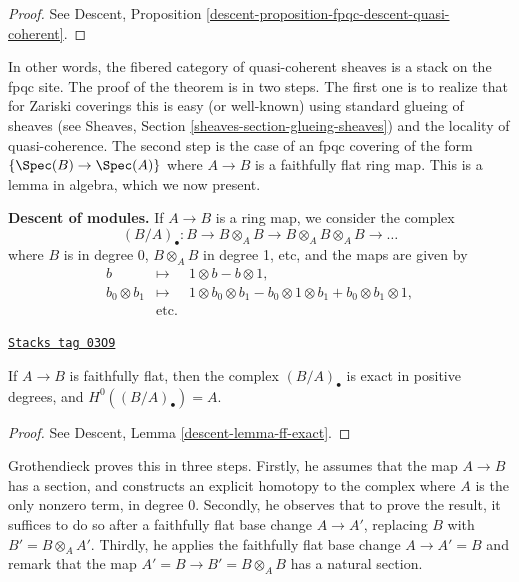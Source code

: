 \begin{proof}
See
Descent, Proposition \ref{descent-proposition-fpqc-descent-quasi-coherent}.
\end{proof}

In other words, the fibered category of quasi-coherent sheaves is a stack on
the fpqc site.
The proof of the theorem is in two steps. The first one is to realize that for
Zariski coverings this is easy (or well-known) using standard glueing of
sheaves (see
Sheaves, Section \ref{sheaves-section-glueing-sheaves})
and the locality of quasi-coherence. The second step is the case of an
fpqc covering of the form $\{\Spec(B) \to \Spec(A)\}$
where $A \to B$ is a faithfully flat ring map.
This is a lemma in algebra, which we now present.

\medskip\noindent
{\bf Descent of modules.}
If $A \to B$ is a ring map, we consider the complex
$$
(B/A)_\bullet : B \to B \otimes_A B \to B \otimes_A B \otimes_A B \to \ldots
$$
where $B$ is in degree 0, $B \otimes_A B$ in degree 1, etc, and the maps are
given by
\begin{eqnarray*}
b & \mapsto & 1 \otimes b - b \otimes 1, \\
b_0 \otimes b_1 & \mapsto & 1 \otimes b_0 \otimes b_1 - b_0 \otimes 1 \otimes
b_1 + b_0 \otimes b_1 \otimes 1, \\
& \text{etc.}
\end{eqnarray*}

\begin{lemma}
\label{etale-cohomology-lemma-algebra-descent}
\href{https://stacks.math.columbia.edu/tag/03O9}{\texttt{Stacks tag 03O9}}

If $A \to B$ is faithfully flat, then the complex $(B/A)_\bullet$ is exact in
positive degrees, and $H^0((B/A)_\bullet) = A$.
\end{lemma}

\begin{proof}
See Descent, Lemma \ref{descent-lemma-ff-exact}.
\end{proof}

Grothendieck proves this in three steps. Firstly, he assumes that the map $A
\to B$ has a section, and constructs an explicit homotopy to the complex where
$A$ is the only nonzero term, in degree 0. Secondly, he observes that to prove
the result, it suffices to do so after a faithfully flat base change $A \to
A'$, replacing $B$ with $B' = B \otimes_A A'$. Thirdly, he applies the
faithfully flat base change $A \to A' = B$ and remark that the map
$A' = B \to B' = B \otimes_A B$ has a natural section.

